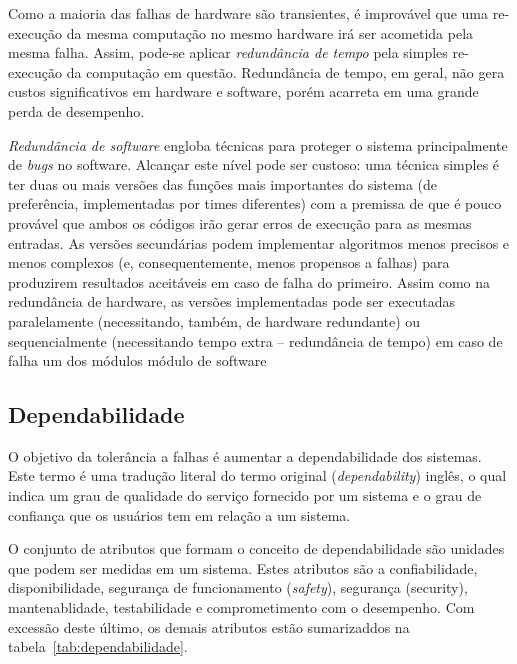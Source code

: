 Como a maioria das falhas de hardware são transientes, é improvável que uma re-execução da mesma computação no mesmo hardware irá ser acometida pela mesma falha. Assim, pode-se aplicar \emph{redundância de tempo} pela simples re-execução da computação em questão. Redundância de tempo, em geral, não gera custos significativos em hardware e software, porém acarreta em uma grande perda de desempenho.

\emph{Redundância de software} engloba técnicas para proteger o sistema principalmente de \emph{bugs} no software. Alcançar este nível pode ser custoso: uma técnica simples é ter duas ou mais versões das funções mais importantes do sistema (de preferência, implementadas por times diferentes) com a premissa de que é pouco provável que ambos os códigos irão gerar erros de execução para as mesmas entradas. As versões secundárias podem implementar algoritmos menos precisos e menos complexos (e, consequentemente, menos propensos a falhas) para produzirem resultados aceitáveis em caso de falha do primeiro. Assim como na redundância de hardware, as versões implementadas pode ser executadas paralelamente (necessitando, também, de hardware redundante) ou sequencialmente (necessitando tempo extra -- redundância de tempo) em caso de falha um dos módulos módulo de software

\subsection{Dependabilidade} %
\label{sub:dependabilidade}

O objetivo da tolerância a falhas é aumentar a dependabilidade dos sistemas. Este termo é uma tradução literal do termo original (\emph{dependability}) inglês, o qual indica um grau de qualidade do serviço fornecido por um sistema e o grau de confiança que os usuários tem em relação a um sistema.

O conjunto de atributos que formam o conceito de dependabilidade são unidades que podem ser medidas em um sistema. Estes atributos são a confiabilidade, disponibilidade, segurança de funcionamento (\emph{safety}), segurança (security), mantenablidade, testabilidade e comprometimento com o desempenho. Com excessão deste último, os demais atributos estão sumarizaddos na tabela~\ref{tab:dependabilidade}.

